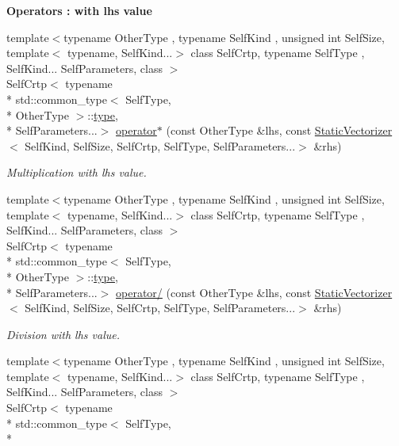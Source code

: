 \begin{Indent}{\bf Operators \-: with lhs value}
\begin{DoxyCompactItemize}
{\footnotesize template$<$typename Other\-Type , typename Self\-Kind , unsigned int Self\-Size, template$<$ typename, Self\-Kind...$>$ class Self\-Crtp, typename Self\-Type , Self\-Kind... Self\-Parameters, class $>$ }\\Self\-Crtp$<$ typename \\*
std\-::common\-\_\-type$<$ Self\-Type, \\*
Other\-Type $>$\-::\hyperlink{classmagrathea_1_1StaticVectorizer_a28c393a3896a3e839008c35d56b10a54}{type}, \\*
Self\-Parameters...$>$ \hyperlink{classmagrathea_1_1StaticVectorizer_a3569cddd30a871d7e2b3dde8e5edecc7}{operator$\ast$} (const Other\-Type \&lhs, const \hyperlink{classmagrathea_1_1StaticVectorizer}{Static\-Vectorizer}$<$ Self\-Kind, Self\-Size, Self\-Crtp, Self\-Type, Self\-Parameters...$>$ \&rhs)
\begin{DoxyCompactList}\small\item\em Multiplication with lhs value. \end{DoxyCompactList}\item 
{\footnotesize template$<$typename Other\-Type , typename Self\-Kind , unsigned int Self\-Size, template$<$ typename, Self\-Kind...$>$ class Self\-Crtp, typename Self\-Type , Self\-Kind... Self\-Parameters, class $>$ }\\Self\-Crtp$<$ typename \\*
std\-::common\-\_\-type$<$ Self\-Type, \\*
Other\-Type $>$\-::\hyperlink{classmagrathea_1_1StaticVectorizer_a28c393a3896a3e839008c35d56b10a54}{type}, \\*
Self\-Parameters...$>$ \hyperlink{classmagrathea_1_1StaticVectorizer_a5e6fb0e0d7f699355cbaf6698d0b66c4}{operator/} (const Other\-Type \&lhs, const \hyperlink{classmagrathea_1_1StaticVectorizer}{Static\-Vectorizer}$<$ Self\-Kind, Self\-Size, Self\-Crtp, Self\-Type, Self\-Parameters...$>$ \&rhs)
\begin{DoxyCompactList}\small\item\em Division with lhs value. \end{DoxyCompactList}\item 
{\footnotesize template$<$typename Other\-Type , typename Self\-Kind , unsigned int Self\-Size, template$<$ typename, Self\-Kind...$>$ class Self\-Crtp, typename Self\-Type , Self\-Kind... Self\-Parameters, class $>$ }\\Self\-Crtp$<$ typename \\*
std\-::common\-\_\-type$<$ Self\-Type, \\*

\end{DoxyCompactItemize}
\end{Indent}
